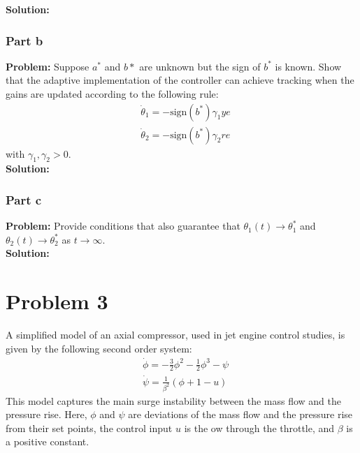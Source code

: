 \documentclass[letter]{article}
\begin{document}
\noindent
\textbf{Solution:}





\subsubsection{Part b}
\textbf{Problem:}
Suppose $a^*$ and $b*$ are unknown but the sign of $b^*$ is known. Show that the adaptive implementation of the controller can achieve tracking when the gains are updated according to the following rule:
\begin{align}
	& \dot{\theta}_1 = - \text{sign}(b^*) \gamma_1 y e\\
	& \dot{\theta}_2 = - \text{sign}(b^*) \gamma_2 r e
\end{align}
with $\gamma_1, \gamma_2 > 0$.\\

\noindent
\textbf{Solution:}





\subsubsection{Part c}
\textbf{Problem:}
Provide conditions that also guarantee that $\theta_1(t) \to \theta_1^*$ and $\theta_2(t) \to \theta_2^*$ as $t\to\infty$.\\

\noindent
\textbf{Solution:}















\newpage
\section{Problem 3}
A simplified model of an axial compressor, used in jet engine control studies, is given by the following second order system:
\begin{equation}
	\begin{aligned}
		&\dot{\phi} = - \frac{3}{2} \phi^2 - \frac{1}{2} \phi^3 - \psi\\
		&\dot{\psi} = \frac{1}{\beta^2}(\phi + 1 - u)
	\end{aligned}
\end{equation}
This model captures the main surge instability between the mass flow and the pressure rise. Here, $\phi$ and $\psi$ are deviations of the mass flow and the pressure rise from their set points, the control input $u$ is the 
ow through the throttle, and $\beta$ is a positive constant.
\end{document}
